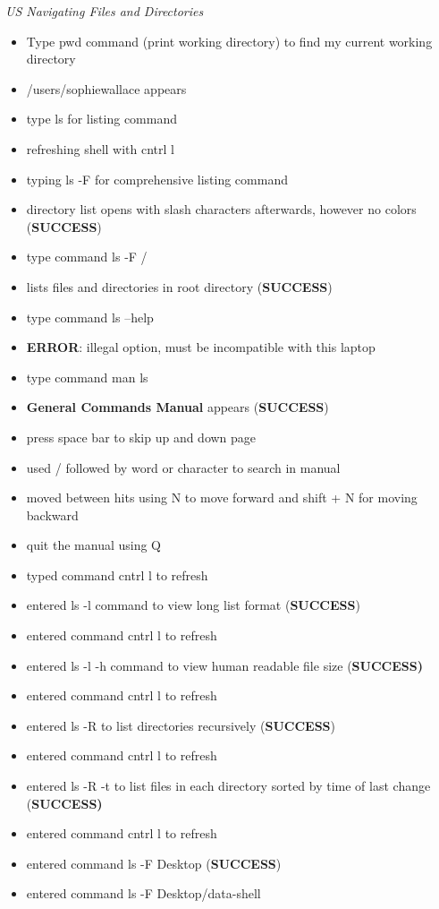 \documentclass{article}
\begin{document}
\textit{US Navigating Files and Directories}
\begin{itemize}
\item Type pwd command (print working directory) to find my current working directory
\item /users/sophiewallace appears
\item type ls for listing command
\item refreshing shell with cntrl l
\item typing ls -F for comprehensive listing command
\item directory list opens with slash characters afterwards, however no colors (\textbf{SUCCESS})
\item type command ls -F /
\item lists files and directories in root directory (\textbf{SUCCESS})
\item type command ls --help
\item \textbf{ERROR}: illegal option, must be incompatible with this laptop
\item type command man ls
\item \textbf{General Commands Manual} appears (\textbf{SUCCESS}) 
\item press space bar to skip up and down page
\item used / followed by word or character to search in manual 
\item moved between hits using N to move forward and shift + N for moving backward
\item quit the manual using Q
\item typed command cntrl l to refresh
\item entered ls -l command to view long list format (\textbf{SUCCESS})
\item entered command cntrl l to refresh
\item entered ls -l -h command to view human readable file size (\textbf{SUCCESS)}
\item entered command cntrl l to refresh
\item entered ls -R to list directories recursively (\textbf{SUCCESS})
\item entered command cntrl l to refresh
\item entered ls -R -t to list files in each directory sorted by time of last change (\textbf{SUCCESS)}
\item entered command cntrl l to refresh
\item entered command ls -F Desktop (\textbf{SUCCESS})
\item entered command ls -F Desktop/data-shell

\end{itemize}
\end{document}
